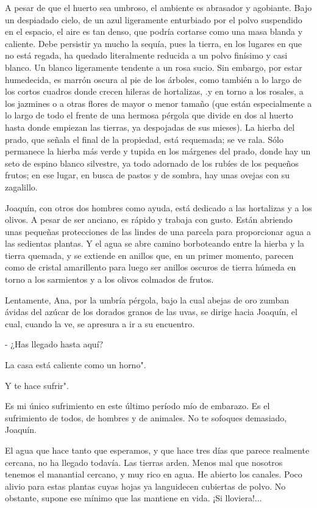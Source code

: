 \documentclass[12pt, twoside, openright]{book} %
\begin{document}
A pesar de que el huerto sea umbroso, el ambiente es abrasador y agobiante. Bajo un despiadado cielo, de un azul ligeramente enturbiado por el polvo suspendido en el espacio, el aire es tan denso, que podría cortarse como una masa blanda y caliente. Debe persistir ya mucho la sequía, pues la tierra, en los lugares en que no está regada, ha quedado literalmente reducida a un polvo finísimo y casi blanco. Un blanco ligeramente tendente a un rosa sucio. Sin embargo, por estar humedecida, es marrón oscura al pie de los árboles, como también a lo largo de los cortos cuadros donde crecen hileras de hortalizas, .y en torno a los rosales, a los jazmines o a otras flores de mayor o menor tamaño (que están especialmente a lo largo de todo el frente de una hermosa pérgola que divide en dos al huerto hasta donde empiezan las tierras, ya despojadas de sus mieses). La hierba del prado, que señala el final de la propiedad, está requemada; se ve rala. Sólo permanece la hierba más verde y tupida en los márgenes del prado, donde hay un seto de espino blanco silvestre, ya todo adornado de los rubíes de los pequeños frutos; en ese lugar, en busca de pastos y de sombra, hay unas ovejas con su zagalillo. 

Joaquín, con otros dos hombres como ayuda, está dedicado a las hortalizas y a los olivos. A pesar de ser anciano, es rápido y trabaja con gusto. Están abriendo unas pequeñas protecciones de las lindes de una parcela para proporcionar agua a las sedientas plantas. Y el agua se abre camino borboteando entre la hierba y la tierra quemada, y se extiende en anillos que, en un primer momento, parecen como de cristal amarillento para luego ser anillos oscuros de tierra húmeda en torno a los sarmientos y a los olivos colmados de frutos. 

Lentamente, Ana, por la umbría pérgola, bajo la cual abejas de oro zumban ávidas del azúcar de los dorados granos de las uvas, se dirige hacia Joaquín, el cual, cuando la ve, se apresura a ir a su encuentro. 

- ¿Has llegado hasta aquí? 

La casa está caliente como un horno". 

Y te hace sufrir". 

Es mi único sufrimiento en este último período mío de embarazo. Es el sufrimiento de todos, de hombres y de animales. No te sofoques demasiado, Joaquín. 

El agua que hace tanto que esperamos, y que hace tres días que parece realmente cercana, no ha llegado todavía. Las tierras arden. Menos mal que nosotros tenemos el manantial cercano, y muy rico en agua. He abierto los canales. Poco alivio para estas plantas cuyas hojas ya languidecen cubiertas de polvo. No obstante, supone ese mínimo que las mantiene en vida. ¡Si lloviera!... 
\end{document}
